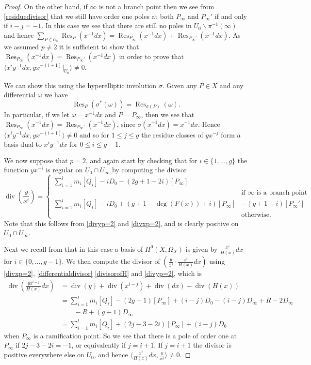 \documentclass[draft, 11pt]{article} %
\theoremstyle{plain}
\theoremstyle{remark}
\newcommand{\hzero}{{H^0(X,\Omega_X)}}
\DeclareMathOperator{\res}{Res}
\DeclareMathOperator{\di}{div}
\begin{document}
\begin{proof}
On the other hand, if $\infty$ is not a branch point then we see from \eqref{residuedivisor} that we still have order one poles at both $P_\infty$ and $P_\infty'$ if and only if $i-j=-1$.
In this case we see that there are still no poles in $U_0\backslash \pi^{-1}(\infty)$ and hence $\sum_{P \in U_0}\res_P(x^{-1}dx) = \res_{P_\infty}(x^{-1}dx) + \res_{P_\infty'}(x^{-1}dx)$.
As we assumed $p\neq 2$ it is sufficient to show that $\res_{P_\infty}(x^{-1}dx) = \res_{P_\infty'}(x^{-1}dx)$ in order to prove that $\langle x^iy^{-1}dx, yx^{-(i+1)}|_{U_0} \rangle \neq 0$.

We can show this using the hyperelliptic involution $\sigma$.
Given any $P \in X$ and any differential $\omega$ we have
\[
\res_P(\sigma^*(\omega)) = \res_{\sigma(P)}(\omega).
\]
In particular, if we let $\omega = x^{-1}dx$ and $P = P_\infty$, then we see that $\res_{P_\infty} (x^{-1}dx) = \res_{P_\infty'}(x^{-1}dx)$, since $\sigma (x^{-1}dx) = x^{-1}dx$.
Hence $\langle x^iy^{-1}dx, yx^{-(i+1)}\rangle \neq 0$ and so for $1 \leq j \leq g$ the residue classes of $yx^{-j}$  form a basis dual to $x^iy^{-1}dx$ for $0 \leq i \leq g-1$.


We now suppose that $p=2$, and again start by checking that for $i \in \{1, \ldots , g\}$ the function $yx^{-i}$ is regular on $U_0 \cap U_\infty$ by computing the divisor
\begin{equation*}
\di \left( \frac{y}{x^i} \right)  =  \begin{cases}
{\displaystyle \sum_{i=1}^l} m_i[Q_i] -iD_0 -(2g+1 - 2i)[P_\infty] &\\
&  \text{if $\infty$ is a branch point} \\
{\displaystyle \sum_{i=1}^l} m_i[Q_i] - iD_0 +(g+1-\deg(F(x)) + i)[P_\infty] & - (g+1-i)[P_\infty'] \\
&  \text{otherwise}.
\end{cases}
\end{equation*}
Note that this follows from \eqref{divyp=2} and \eqref{divxp=2}, and is clearly positive on $U_0 \cap U_\infty$.

Next we recall from \cite[\S 6]{faithfulaction} that in this case a basis of $\hzero$ is given by $\frac{x^i}{H(x)}dx$ for $i \in \{ 0, \ldots, g-1\}$.
We then compute the divisor of $\left( \frac{y}{x^j} \cdot \frac{x^i}{H(x)}dx\right)$ using \eqref{divxp=2}, \eqref{differentialdivisor} \eqref{divisorofH} and \eqref{divyp=2}, which is
\begin{align*}
\di\left( \frac{yx^{i-j}}{H(x)}dx \right) & = \di(y) + \di(x^{i-j}) + \di( dx) - \di(H(x)) \\
& = \sum_{i=1}^l m_i[Q_i] - (2g+ 1 )[P_\infty] + (i-j)D_0 - (i-j)D_\infty + R - 2D_\infty \\
& \qquad - R + (g+1)D_\infty\\
& = \sum_{i=1}^l m_i[Q_i] + (2j-3-2i)[P_\infty] + (i-j)D_0
\end{align*}
when $P_\infty$ is a ramification point.
So we see that there is a pole of order one at $P_\infty$ if $2j - 3 - 2i = -1$, or equivalently if $j = i+1$.
If $j=i+1$ the divisor is positive everywhere else on $U_0$, and hence $\langle \frac{x^i}{H(x)}dx, \frac{y}{x^j} \rangle \neq 0$. 


\end{proof}
\end{document}
